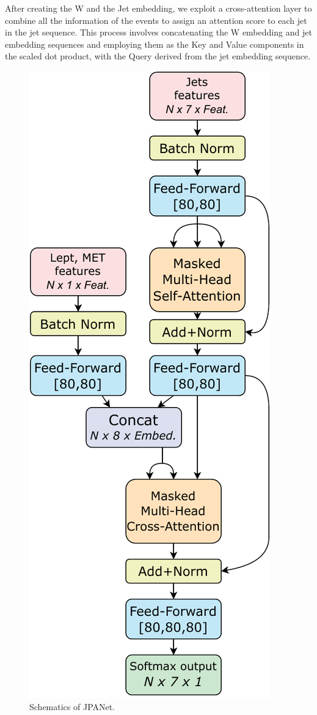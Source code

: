 After creating the W and the Jet embedding, we exploit a cross-attention layer to combine all the information of the events to assign an attention score to each jet in the jet sequence. This process involves concatenating the W embedding and jet embedding sequences and employing them as the Key and Value components in the scaled dot product, with the Query derived from the jet embedding sequence.\\

\begin{minipage}{0.3\linewidth}
\begin{figure}[H]
    \raggedright
    \includegraphics[height=0.5\textheight]{fig//chap08-kin_reco/JPANet_1.pdf}
    \caption{Schematics of JPANet.}
    \label{fig:JPANet1}
\end{figure}
\end{minipage}
